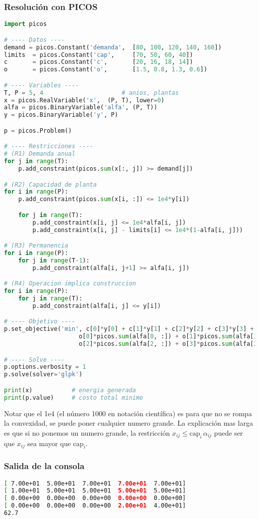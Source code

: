 \documentclass[12pt]{article}
\begin{document}
\subsubsection{Resolución con PICOS}
\begin{lstlisting}[language=Python]
import picos

# ---- Datos ----
demand = picos.Constant('demanda',  [80, 100, 120, 140, 160])
limits  = picos.Constant('cap',     [70, 50, 60, 40])
c       = picos.Constant('c',       [20, 16, 18, 14])
o       = picos.Constant('o',       [1.5, 0.8, 1.3, 0.6])

# ---- Variables ----
T, P = 5, 4                      # anios, plantas
x = picos.RealVariable('x',  (P, T), lower=0)
alfa = picos.BinaryVariable('alfa', (P, T))
y = picos.BinaryVariable('y', P)

p = picos.Problem()

# ---- Restricciones ----
# (R1) Demanda anual
for j in range(T):
    p.add_constraint(picos.sum(x[:, j]) >= demand[j])

# (R2) Capacidad de planta
for i in range(P):
    p.add_constraint(picos.sum(x[i, :]) <= 1e4*y[i])

    for j in range(T):
        p.add_constraint(x[i, j] <= 1e4*alfa[i, j])
        p.add_constraint(x[i, j] - limits[i] <= 1e4*(1-alfa[i, j]))

# (R3) Permanencia
for i in range(P):
    for j in range(T-1):
        p.add_constraint(alfa[i, j+1] >= alfa[i, j])

# (R4) Operacion implica construccion
for i in range(P):
    for j in range(T):
        p.add_constraint(alfa[i, j] <= y[i])

# ---- Objetivo ----
p.set_objective('min', c[0]*y[0] + c[1]*y[1] + c[2]*y[2] + c[3]*y[3] +
                     o[0]*picos.sum(alfa[0, :]) + o[1]*picos.sum(alfa[1, :]) +
                     o[2]*picos.sum(alfa[2, :]) + o[3]*picos.sum(alfa[3, :]))

# ---- Solve ----
p.options.verbosity = 1
p.solve(solver='glpk')

print(x)           # energia generada
print(p.value)     # costo total minimo
\end{lstlisting}

\vspace{0.5em}
Notar que el 1e4 (el número 1000 en notación científica) es para que no se rompa la convexidad, se puede poner cualquier numero grande. La explicación mas larga es que si no ponemos un numero grande, la restricción $x_{ij} \le \text{cap}_i\,\alpha_{ij}$ puede ser que $x_{ij}$ sea mayor que $\text{cap}_i$.

\subsubsection{Salida de la consola}

\begin{lstlisting}[language=bash,backgroundcolor=\color{black},basicstyle=\color{white}\ttfamily,numbers=none]
[ 7.00e+01  5.00e+01  7.00e+01  7.00e+01  7.00e+01]
[ 1.00e+01  5.00e+01  5.00e+01  5.00e+01  5.00e+01]
[ 0.00e+00  0.00e+00  0.00e+00  0.00e+00  0.00e+00]
[ 0.00e+00  0.00e+00  0.00e+00  2.00e+01  4.00e+01]
62.7
\end{lstlisting}
\end{document}
